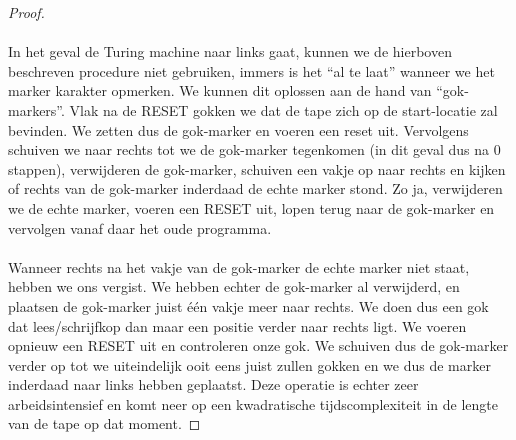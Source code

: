 \documentclass[a4paper]{article}
\begin{document}
\begin{question}
\begin{answer}
\begin{enumerate}
\begin{proof}
\paragraph{}
In het geval de Turing machine naar links gaat, kunnen we de hierboven beschreven procedure niet gebruiken, immers is het ``al te laat'' wanneer we het marker karakter opmerken. We kunnen dit oplossen aan de hand van ``gok-markers''. Vlak na de RESET gokken we dat de tape zich op de start-locatie zal bevinden. We zetten dus de gok-marker en voeren een reset uit. Vervolgens schuiven we naar rechts tot we de gok-marker tegenkomen (in dit geval dus na $0$ stappen), verwijderen de gok-marker, schuiven een vakje op naar rechts en kijken of rechts van de gok-marker inderdaad de echte marker stond. Zo ja, verwijderen we de echte marker, voeren een RESET uit, lopen terug naar de gok-marker en vervolgen vanaf daar het oude programma.
\paragraph{}
Wanneer rechts na het vakje van de gok-marker de echte marker niet staat, hebben we ons vergist. We hebben echter de gok-marker al verwijderd, en plaatsen de gok-marker juist \'e\'en vakje meer naar rechts. We doen dus een gok dat lees/schrijfkop dan maar een positie verder naar rechts ligt. We voeren opnieuw een RESET uit en controleren onze gok. We schuiven dus de gok-marker verder op tot we uiteindelijk ooit eens juist zullen gokken en we dus de marker inderdaad naar links hebben geplaatst. Deze operatie is echter zeer arbeidsintensief en komt neer op een kwadratische tijdscomplexiteit in de lengte van de tape op dat moment.
\end{proof}
\end{enumerate}
\end{answer}
\end{question}
\end{document}
